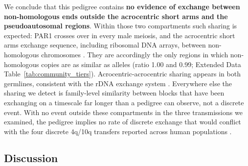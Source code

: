 \documentclass[pdflatex,mathphys]{jnl}
\begin{document}
We conclude that this pedigree contains \textbf{no evidence of exchange between non-homologous ends
outside the acrocentric short arms and the pseudoautosomal regions}. Within those two compartments such sharing
is expected: PAR1 crosses over in every male meiosis, and the acrocentric short arms exchange sequence,
including ribosomal DNA arrays, between non-homologous chromosomes \cite{Guarracino2023}. They are accordingly the only regions in which non-homologous copies
are as similar as alleles (ratio 1.00 and 0.99; Extended Data Table~\ref{tab:community_tiers}). Acrocentric-acrocentric sharing
appears in both germlines, consistent with the rDNA exchange system \cite{Guarracino2023}. Everywhere
else the sharing we detect is family-level similarity between blocks that have been exchanging on a
timescale far longer than a pedigree can observe, not a discrete event.
With no event outside these compartments in the three transmissions we examined, the pedigree
implies no rate of discrete exchange that would conflict with the four discrete 4q/10q transfers
reported across human populations \cite{dux4_d4z4_fshd_lemmers2010worldwide}.

\subsection*{Discussion}
\end{document}
